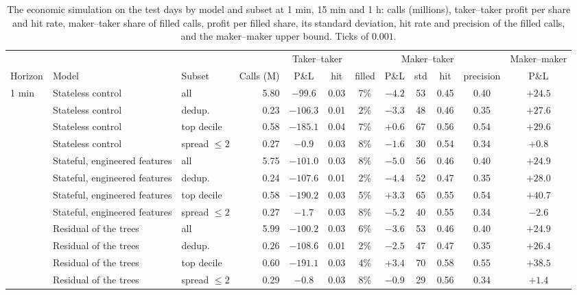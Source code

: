 \begin{table}[p]
\centering
\caption{The economic simulation on the test days by model and subset at 1 min, 15 min and 1 h:
calls (millions),
taker--taker profit per share and hit rate, maker--taker share of filled calls, profit per
filled share, its standard deviation, hit rate and precision of the filled calls, and the
maker--maker upper bound.  Ticks of $0.001$.}
\label{tab:app:econ}
\footnotesize
\begin{fittable}\begin{tabular}{lllrcccccccc}
\toprule
& & & & \multicolumn{2}{c}{Taker--taker} & \multicolumn{5}{c}{Maker--taker} & Maker--maker \\
\cmidrule(lr){5-6}\cmidrule(lr){7-11}\cmidrule(lr){12-12}
Horizon & Model & Subset & Calls (M) & P\&L & hit & filled & P\&L & std & hit & precision & P\&L \\
\midrule
1 min & Stateless control & all & 5.80 & $-99.6$ & 0.03 & 7\% & $-4.2$ & 53 & 0.45 & 0.40 & $+24.5$ \\
 & Stateless control & dedup. & 0.23 & $-106.3$ & 0.01 & 2\% & $-3.3$ & 48 & 0.46 & 0.35 & $+27.6$ \\
 & Stateless control & top decile & 0.58 & $-185.1$ & 0.04 & 7\% & $+0.6$ & 67 & 0.56 & 0.54 & $+29.6$ \\
 & Stateless control & spread $\le 2$ & 0.27 & $-0.9$ & 0.03 & 8\% & $-1.6$ & 30 & 0.54 & 0.34 & $+0.8$ \\
 & Stateful, engineered features & all & 5.75 & $-101.0$ & 0.03 & 8\% & $-5.0$ & 56 & 0.46 & 0.40 & $+24.9$ \\
 & Stateful, engineered features & dedup. & 0.24 & $-107.6$ & 0.01 & 2\% & $-4.4$ & 52 & 0.47 & 0.35 & $+28.0$ \\
 & Stateful, engineered features & top decile & 0.58 & $-190.2$ & 0.03 & 5\% & $+3.3$ & 65 & 0.55 & 0.54 & $+40.7$ \\
 & Stateful, engineered features & spread $\le 2$ & 0.27 & $-1.7$ & 0.03 & 8\% & $-5.2$ & 40 & 0.55 & 0.34 & $-2.6$ \\
 & Residual of the trees & all & 5.99 & $-100.2$ & 0.03 & 6\% & $-3.6$ & 53 & 0.46 & 0.40 & $+24.9$ \\
 & Residual of the trees & dedup. & 0.26 & $-108.6$ & 0.01 & 2\% & $-2.5$ & 47 & 0.47 & 0.35 & $+26.4$ \\
 & Residual of the trees & top decile & 0.60 & $-191.1$ & 0.03 & 4\% & $+3.4$ & 70 & 0.58 & 0.55 & $+38.5$ \\
 & Residual of the trees & spread $\le 2$ & 0.29 & $-0.8$ & 0.03 & 8\% & $-0.9$ & 29 & 0.56 & 0.34 & $+1.4$ \\

\end{tabular}
\end{fittable}
\end{table}
